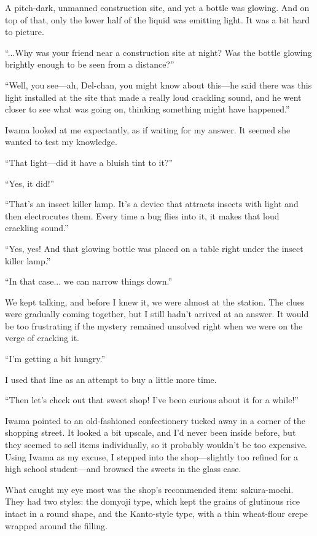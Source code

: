 \documentclass[
    a4paper,
    12pt,
    twoside,
    openany,
    UTF8,
    fontset=windows
]{ctexbook}
\begin{document}
A pitch-dark, unmanned construction site, and yet a bottle was glowing. And on top of that, only the lower half of the liquid was emitting light. It was a bit hard to picture.

``...Why was your friend near a construction site at night? Was the bottle glowing brightly enough to be seen from a distance?''

``Well, you see---ah, Del-chan, you might know about this---he said there was this light installed at the site that made a really loud crackling sound, and he went closer to see what was going on, thinking something might have happened.''

Iwama looked at me expectantly, as if waiting for my answer. It seemed she wanted to test my knowledge.

``That light---did it have a bluish tint to it?''

``Yes, it did!''

``That's an insect killer lamp. It's a device that attracts insects with light and then electrocutes them. Every time a bug flies into it, it makes that loud crackling sound.''

``Yes, yes! And that glowing bottle was placed on a table right under the insect killer lamp.''

``In that case... we can narrow things down.''

We kept talking, and before I knew it, we were almost at the station. The clues were gradually coming together, but I still hadn't arrived at an answer. It would be too frustrating if the mystery remained unsolved right when we were on the verge of cracking it.

``I'm getting a bit hungry.''

I used that line as an attempt to buy a little more time.

``Then let's check out that sweet shop! I've been curious about it for a while!''

Iwama pointed to an old-fashioned confectionery tucked away in a corner of the shopping street. It looked a bit upscale, and I'd never been inside before, but they seemed to sell items individually, so it probably wouldn't be too expensive. Using Iwama as my excuse, I stepped into the shop---slightly too refined for a high school student---and browsed the sweets in the glass case.

What caught my eye most was the shop's recommended item: sakura-mochi. They had two styles: the domyoji type, which kept the grains of glutinous rice intact in a round shape, and the Kanto-style type, with a thin wheat-flour crepe wrapped around the filling.
\end{document}
